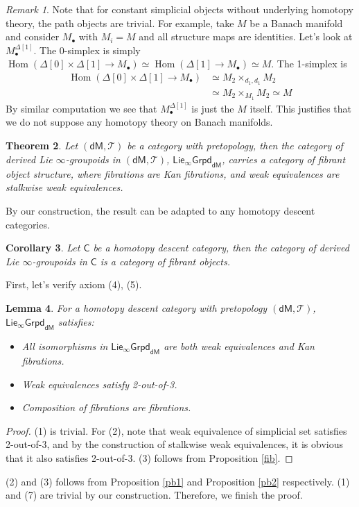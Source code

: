\documentclass[12pt]{amsart}
\newtheorem{thm}{Theorem}[section]
\newtheorem{cor}[thm]{Corollary}
\newtheorem{lem}[thm]{Lemma}
\theoremstyle{definition}
\theoremstyle{remark}
\newtheorem{rem}[thm]{Remark}
\numberwithin{equation}{section}
\newcommand{\CC}{{\mathsf C}}
\newcommand{\1}{{\mathbb{1}}}
\newcommand{\dm}{\mathsf{dM}}
\newcommand{\ilgpd}{\mathsf{Lie_{\infty}Grpd}}
\newcommand{\bt}{\bullet}
\newcommand{\Hom}{\operatorname{Hom}}
\begin{document}
\begin{rem}
    Note that for constant simplicial objects without underlying homotopy theory, the path objects are trivial. For example, take $M$ be a Banach manifold and consider $M_{\bt}$ with $M_i=M$ and all structure maps are identities. Let's look at $M_{\bt}^{\Delta[1]}$. The 0-simplex is simply $\Hom(\Delta[0]\times \Delta[1]\to M_{\bt})\simeq \Hom(\Delta[1]\to M_{\bt})\simeq M$. The 1-simplex is 
    \begin{align}
        \Hom(\Delta[0]\times \Delta[1]\to M_{\bt})  &\simeq M_2\times_{d_1,d_1} M_2\\
        &\simeq M_2\times_{M_1} M_2 \simeq M
    \end{align}
    By similar computation we see that $M_{\bt}^{\Delta[1]}$ is just the $M$ itself. This justifies that we do not suppose any homotopy theory on Banach manifolds.
\end{rem}
 
 \begin{thm}
    Let $(\dm, \mathcal{T})$ be a category with pretopology, then the category of derived Lie $\infty$-groupoids in $(\dm, \mathcal{T})$, $\ilgpd_{\dm}$,  carries a category of fibrant object structure, where fibrations are Kan fibrations, and weak equivalences are stalkwise weak equivalences.
 \end{thm}
 By our construction, the result can be adapted to any homotopy descent categories.
 \begin{cor}
    Let $\CC$ be a homotopy descent category, then the category of derived Lie $\infty$-groupoids in $\CC$ is a category of fibrant objects.
 \end{cor}
 First, let's verify axiom (4), (5).
 \begin{lem}For a homotopy descent category with pretopology $(\dm, \mathcal{T})$, $\ilgpd_{\dm}$ satisfies:
     \begin{itemize}
         \item All isomorphisms in $\ilgpd_{\dm}$ are both weak equivalences and Kan fibrations.
         \item Weak equivalences satisfy 2-out-of-3.
         \item Composition of fibrations are fibrations.
     \end{itemize}
 \end{lem}
 \begin{proof}
    (1) is trivial. For (2), note that weak equivalence of simplicial set satisfies 2-out-of-3, and by the construction of stalkwise weak equivalences, it is obvious that it also satisfies 2-out-of-3. (3) follows from Proposition \ref{fib}.
 \end{proof}
 (2) and (3) follows from Proposition \ref{pb1} and Proposition \ref{pb2} respectively. (1) and (7) are trivial by our construction. Therefore, we finish the proof.
 
\end{document}
